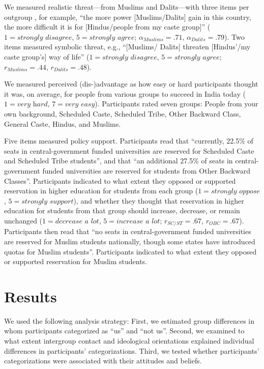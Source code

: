 \documentclass[12pt, a4paper]{article}
\begin{document}
We measured realistic threat---from Muslims and Dalits---with three items per outgroup \cite{schmid_reducing_2014}, for example, ``the more power [Muslims/Dalits] gain in this country, the more difficult it is for [Hindus/people from my caste group]'' ($1 = \textit{strongly disagree}$, $5 = \textit{strongly agree}$; $\alpha_\textit{Muslims} = .71$, $\alpha_\textit{Dalits} = .79$). Two items measured symbolic threat, e.g., ``[Muslims/ Dalits] threaten [Hindus'/my caste group's] way of life'' ($1 = \textit{strongly disagree}$, $5 = \textit{strongly agree}$; $r_\textit{Muslims} = .44$, $r_\textit{Dalits} = .48$).

We measured perceived (dis-)advantage as how easy or hard participants thought it was, on average, for people from various groups to succeed in India today ($1 = \textit{very hard}$, $7 = \textit{very easy}$). Participants rated seven groups: People from your own background, Scheduled Caste, Scheduled Tribe, Other Backward Class, General Caste, Hindus, and Muslims.

Five items measured policy support. Participants read that ``currently, 22.5\% of seats in central-government funded universities are reserved for Scheduled Caste and Scheduled Tribe students'', and that ``an additional 27.5\% of seats in central-government funded universities are reserved for students from Other Backward Classes''. Participants indicated to what extent they opposed or supported reservation in higher education for students from each group ($1 = \textit{strongly oppose}$, $5 = \textit{strongly support}$), and whether they thought that reservation in higher education for students from that group should increase, decrease, or remain unchanged ($1 = \textit{decrease a lot}$, $5 = \textit{increase a lot}$; $r_\textit{SC/ST} = .67$, $r_\textit{OBC} = .67$). Participants then read that ``no seats in central-government funded universities are reserved for Muslim students nationally, though some states have introduced quotas for Muslim students''. Participants indicated to what extent they opposed or supported reservation for Muslim students.

\section{Results}

We used the following analysis strategy: First, we estimated group differences in whom participants categorized as ``us'' and ``not us''. Second, we examined to what extent intergroup contact and ideological orientations explained individual differences in participants' categorizations. Third, we tested whether participants' categorizations were associated with their attitudes and beliefs.
\end{document}
